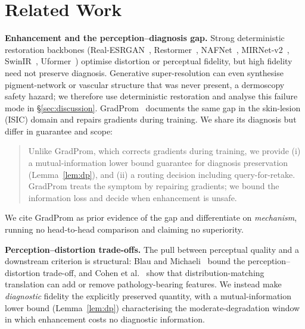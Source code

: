 
\section{Related Work}
\label{sec:related}

\textbf{Enhancement and the perception--diagnosis gap.}
Strong deterministic restoration backbones
(Real-ESRGAN~\citep{wang2021realesrgan}, Restormer~\citep{zamir2022restormer},
NAFNet~\citep{chen2022simple}, MIRNet-v2~\citep{zamir2022mirnetv2},
SwinIR~\citep{liang2021swinir}, Uformer~\citep{wang2022uformer}) optimise
distortion or perceptual fidelity, but high fidelity need not preserve
diagnosis. Generative super-resolution can even synthesise pigment-network or
vascular structure that was never present, a dermoscopy safety hazard; we
therefore use deterministic restoration and analyse this failure mode in
\S\ref{sec:discussion}. GradProm~\citep{gradprom2025} documents the same
gap in the skin-lesion (ISIC) domain and repairs gradients during training.
We share its diagnosis but differ in guarantee and scope:
\begin{quote}
Unlike GradProm, which corrects gradients during training, we provide (i) a
mutual-information lower bound guarantee for diagnosis preservation
(Lemma~\ref{lem:dp}), and (ii) a routing decision including query-for-retake.
GradProm treats the symptom by repairing gradients; we bound the information
loss and decide when enhancement is unsafe.
\end{quote}
We cite GradProm as prior evidence of the gap and differentiate on
\emph{mechanism}, running no head-to-head comparison and claiming no superiority.

\textbf{Perception--distortion trade-offs.}
The pull between perceptual quality and a downstream criterion is structural:
Blau and Michaeli~\citep{blau2018perception} bound the perception--distortion
trade-off, and Cohen et al.~\citep{cohen2018distribution} show that
distribution-matching translation can add or remove pathology-bearing features.
We instead make \emph{diagnostic} fidelity the explicitly preserved quantity,
with a mutual-information lower bound (Lemma~\ref{lem:dp}) characterising the
moderate-degradation window in which enhancement costs no diagnostic information.

